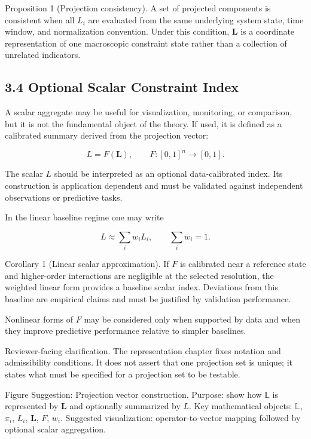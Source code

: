 \documentclass[aps,pre,reprint,superscriptaddress,nofootinbib]{revtex4-2}
\begin{document}
Proposition 1 (Projection consistency). A set of projected components is consistent when all \(L_i\) are evaluated from the same underlying system state, time window, and normalization convention. Under this condition, \(\mathbf{L}\) is a coordinate representation of one macroscopic constraint state rather than a collection of unrelated indicators.

\subsection{3.4 Optional Scalar Constraint Index}

A scalar aggregate may be useful for visualization, monitoring, or comparison, but it is not the fundamental object of the theory. If used, it is defined as a calibrated summary derived from the projection vector:

\[ L=F(\mathbf{L}), \qquad F:[0,1]^n\rightarrow[0,1]. \]

The scalar \(L\) should be interpreted as an optional data-calibrated index. Its construction is application dependent and must be validated against independent observations or predictive tasks.

In the linear baseline regime one may write

\[ L\approx\sum_i w_i L_i, \qquad \sum_i w_i=1. \]

Corollary 1 (Linear scalar approximation). If \(F\) is calibrated near a reference state and higher-order interactions are negligible at the selected resolution, the weighted linear form provides a baseline scalar index. Deviations from this baseline are empirical claims and must be justified by validation performance.

Nonlinear forms of \(F\) may be considered only when supported by data and when they improve predictive performance relative to simpler baselines.

Reviewer-facing clarification. The representation chapter fixes notation and admissibility conditions. It does not assert that one projection set is unique; it states what must be specified for a projection set to be testable.

Figure Suggestion: Projection vector construction. Purpose: show how \(\mathbb{L}\) is represented by \(\mathbf{L}\) and optionally summarized by \(L\). Key mathematical objects: \(\mathbb{L}\), \(\pi_i\), \(L_i\), \(\mathbf{L}\), \(F\), \(w_i\). Suggested visualization: operator-to-vector mapping followed by optional scalar aggregation.
\end{document}
